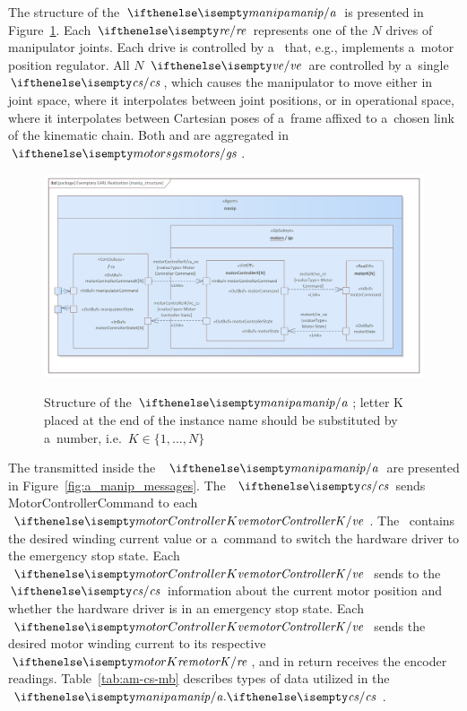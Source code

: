 \documentclass[11pt,oneside,a4paper]{article}
\newcommand{\Table}[0]{Table}
\newcommand{\Figure}[0]{Figure}
\begin{document}
	The structure of the \ManipulatorAgent{} $\ea{manip}$ is presented in \Figure{}~\ref{fig:a_m}.
	Each \RealEffector{} $\ere{}$ represents one of the $N$ drives of manipulator joints.
	Each drive is controlled by a~\VirtualEffector{} that, e.g., implements a~motor position regulator.
	All $N$ \VirtualEffectors{} $\eve{}$ are controlled by a~single \ControlSubsystem{} $\ecs{}$, which causes the manipulator to move either in joint space,
	where it interpolates between joint positions, or in operational space, where it interpolates between Cartesian poses of a~frame affixed to a~chosen link of the kinematic chain. Both \VirtualEffectors{} and \RealEffector{} are aggregated in \GroupofSubsystems{} $\egs{motors}$.
	\begin{figure}[H]
		\centering
		\begin{center}
			{\includegraphics[width=\columnwidth]{img/basic_earl_instance/manip_structure.png}}
		\end{center}
		\caption{Structure of the \Agent{} $\protect\ea{manip}$; letter K placed at the end of the instance name should be substituted by a~number, i.e.\ $K\in\{1,...,N\}$}
		\label{fig:a_m}
	\end{figure}
	
	The \ValueTypes{} transmitted inside the \ManipulatorAgent{}~$\ea{manip}$ are presented in \Figure{}~\ref{fig:a_manip_messages}.
	The~\ControlSubsystem{} $\ecs{}$ sends MotorControllerCommand to each \VirtualEffector{}\\ $\eve{motorControllerK}$. The~\ValueType{} contains the desired winding current
	value or a~command to switch the hardware driver to the emergency stop state. Each \VirtualEffector{} $\eve{motorControllerK}$ sends to
	the \ControlSubsystem{} $\ecs{}$ information about the current motor position and whether the hardware driver is in an emergency stop state.
	Each \VirtualEffector{} $\eve{motorControllerK}$ sends the desired motor winding current to its respective \RealEffector{} $\ere{motorK}$, and in return receives the encoder readings.
	\Table{}~\ref{tab:am-cs-mb} describes types of data utilized in the $\ea{manip}.\ecs{}$.
	
\end{document}
